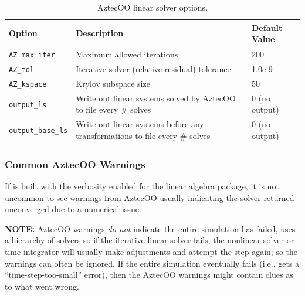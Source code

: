 \begin{table}[htp]
\caption[AztecOO linear solver options.]{AztecOO linear solver options.}
\label{tab:aztecoo:options}
\begin{center}
\begin{tabular}{| p{3cm} | p{9cm} | p{2.5cm} |}
\hline
Option & Description & Default Value \\
\hline
{\tt AZ\_max\_iter}        & Maximum allowed iterations & 200 \\
{\tt AZ\_tol}              & Iterative solver (relative residual) tolerance & 1.0e-9 \\
{\tt AZ\_kspace}           & Krylov subspace size & 50 \\
{\tt output\_ls}           & Write out linear systems solved by AztecOO to file every \# solves & 0 (no output)\\
{\tt output\_base\_ls}     & Write out linear systems before any transformations to file every \# solves & 0 (no output)\\
\hline
\end{tabular}
\end{center}
\end{table}

\subsubsection{Common AztecOO Warnings}

If \Xyce{} is built with the verbosity enabled for the linear algebra package, it is not
uncommon to see warnings from AztecOO usually indicating the solver returned unconverged due to a numerical issue.

\begin{center}
\begin{minipage}{0.85\textwidth}
\color{XyceRed} {\bf NOTE:  }\color{black}  AztecOO warnings {\em do not} indicate the entire simulation has failed, \Xyce{} uses a hierarchy of solvers so if the iterative linear solver fails, the nonlinear solver or time integrator will usually make adjustments and attempt the step again; so the warnings can often be ignored. If the entire simulation eventually fails (i.e., gets a ``time-step-too-small'' error), then the AztecOO warnings might contain clues as to what went wrong.
\end{minipage}
\end{center}

